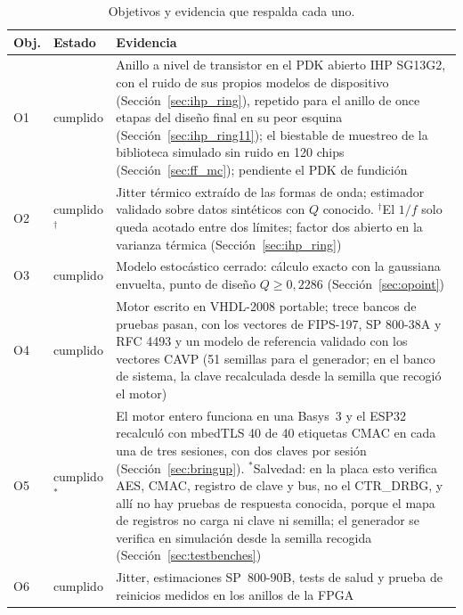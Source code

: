 \begin{table}[htbp]
\centering
\caption{Objetivos y evidencia que respalda cada uno.}
\label{tab:status}
\small
\begin{tabular}{@{}llp{7.4cm}@{}}
\toprule
Obj. & Estado & Evidencia \\
\midrule
O1 & cumplido  & Anillo a nivel de transistor en el \ac{PDK} abierto IHP SG13G2,
              con el ruido de sus propios modelos de dispositivo
              (Sección~\ref{sec:ihp_ring}), repetido para el anillo de once
              etapas del diseño final en su peor esquina
              (Sección~\ref{sec:ihp_ring11}); el biestable de muestreo de
              la biblioteca simulado sin ruido en 120 chips
              (Sección~\ref{sec:ff_mc}); pendiente el \ac{PDK} de fundición \\
O2 & cumplido$^{\dagger}$ & Jitter térmico extraído de las formas de
              onda; estimador validado sobre datos sintéticos con $Q$
              conocido. $^{\dagger}$El $1/f$ solo queda acotado entre dos
              límites; factor dos abierto en la varianza térmica
              (Sección~\ref{sec:ihp_ring}) \\
O3 & cumplido  & Modelo estocástico cerrado: cálculo exacto con la gaussiana envuelta,
              punto de diseño $Q \ge 0{,}2286$ (Sección~\ref{sec:opoint}) \\
O4 & cumplido  & Motor escrito en VHDL-2008 portable; trece bancos de pruebas
              pasan, con los vectores de FIPS-197, SP 800-38A y RFC 4493 y
              un modelo de referencia validado con los vectores \ac{CAVP} (51
              semillas para el generador; en el banco de sistema, la clave
              recalculada desde la semilla que recogió el motor) \\
O5 & cumplido$^{*}$ & El motor entero funciona en una Basys~3 y el ESP32 recalculó
              con mbedTLS 40 de 40 etiquetas \ac{CMAC} en cada una de tres
              sesiones, con dos claves por sesión \meas{}
              (Sección~\ref{sec:bringup}). $^{*}$Salvedad: en la placa esto
              verifica \ac{AES}, \ac{CMAC}, registro de clave y bus, no el
              CTR\_DRBG, y allí no hay pruebas de respuesta conocida,
              porque el mapa de registros no carga ni clave ni semilla; el
              generador se verifica en simulación desde la semilla recogida
              (Sección~\ref{sec:testbenches}) \\
O6 & cumplido  & Jitter, estimaciones SP~800-90B, tests de salud y prueba de
              reinicios medidos en los anillos de la \ac{FPGA}

\end{tabular}
\end{table}
